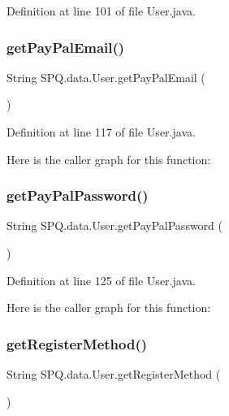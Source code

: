 Definition at line 101 of file User.\+java.

\mbox{\label{class_s_p_q_1_1data_1_1_user_ad3a5ab9fa36272afbc99e7ebfc7de108}} 
\subsubsection{\texorpdfstring{get\+Pay\+Pal\+Email()}{getPayPalEmail()}}
{\footnotesize\ttfamily String S\+P\+Q.\+data.\+User.\+get\+Pay\+Pal\+Email (\begin{DoxyParamCaption}{ }\end{DoxyParamCaption})}



Definition at line 117 of file User.\+java.

Here is the caller graph for this function\+:
\mbox{\label{class_s_p_q_1_1data_1_1_user_aa3a0bdf1676addb67307fa9a66495fa4}} 
\subsubsection{\texorpdfstring{get\+Pay\+Pal\+Password()}{getPayPalPassword()}}
{\footnotesize\ttfamily String S\+P\+Q.\+data.\+User.\+get\+Pay\+Pal\+Password (\begin{DoxyParamCaption}{ }\end{DoxyParamCaption})}



Definition at line 125 of file User.\+java.

Here is the caller graph for this function\+:
\mbox{\label{class_s_p_q_1_1data_1_1_user_a4a336e889bfdefbd439134b27e8873fc}} 
\subsubsection{\texorpdfstring{get\+Register\+Method()}{getRegisterMethod()}}
{\footnotesize\ttfamily String S\+P\+Q.\+data.\+User.\+get\+Register\+Method (\begin{DoxyParamCaption}{ }\end{DoxyParamCaption})}



